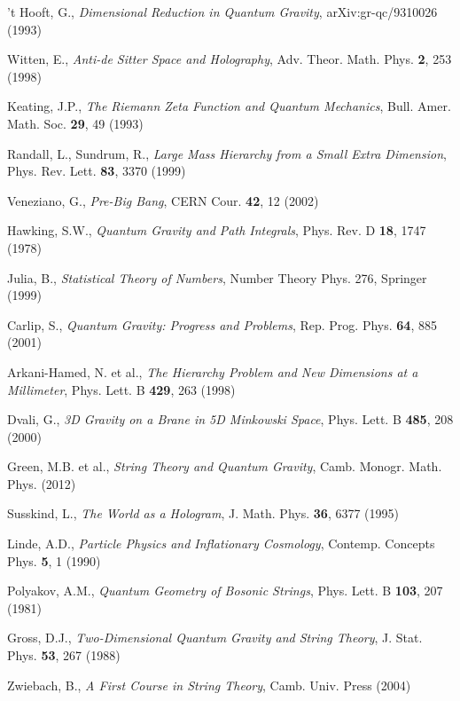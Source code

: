\documentclass[a4paper, 12pt]{article}
\begin{document}
\begin{thebibliography}{30}
't Hooft, G., \textit{Dimensional Reduction in Quantum Gravity}, arXiv:gr-qc/9310026 (1993)

Witten, E., \textit{Anti-de Sitter Space and Holography}, Adv. Theor. Math. Phys. \textbf{2}, 253 (1998)

Keating, J.P., \textit{The Riemann Zeta Function and Quantum Mechanics}, Bull. Amer. Math. Soc. \textbf{29}, 49 (1993)

Randall, L., Sundrum, R., \textit{Large Mass Hierarchy from a Small Extra Dimension}, Phys. Rev. Lett. \textbf{83}, 3370 (1999)

Veneziano, G., \textit{Pre-Big Bang}, CERN Cour. \textbf{42}, 12 (2002)

Hawking, S.W., \textit{Quantum Gravity and Path Integrals}, Phys. Rev. D \textbf{18}, 1747 (1978)

Julia, B., \textit{Statistical Theory of Numbers}, Number Theory Phys. 276, Springer (1999)

Carlip, S., \textit{Quantum Gravity: Progress and Problems}, Rep. Prog. Phys. \textbf{64}, 885 (2001)

Arkani-Hamed, N. et al., \textit{The Hierarchy Problem and New Dimensions at a Millimeter}, Phys. Lett. B \textbf{429}, 263 (1998)

Dvali, G., \textit{3D Gravity on a Brane in 5D Minkowski Space}, Phys. Lett. B \textbf{485}, 208 (2000)

Green, M.B. et al., \textit{String Theory and Quantum Gravity}, Camb. Monogr. Math. Phys. (2012)

Susskind, L., \textit{The World as a Hologram}, J. Math. Phys. \textbf{36}, 6377 (1995)

Linde, A.D., \textit{Particle Physics and Inflationary Cosmology}, Contemp. Concepts Phys. \textbf{5}, 1 (1990)

Polyakov, A.M., \textit{Quantum Geometry of Bosonic Strings}, Phys. Lett. B \textbf{103}, 207 (1981)

Gross, D.J., \textit{Two-Dimensional Quantum Gravity and String Theory}, J. Stat. Phys. \textbf{53}, 267 (1988)

Zwiebach, B., \textit{A First Course in String Theory}, Camb. Univ. Press (2004)


\end{thebibliography}
\end{document}
